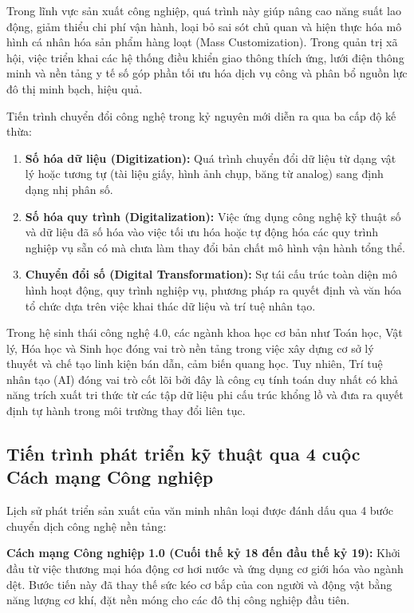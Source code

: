 Trong lĩnh vực sản xuất công nghiệp, quá trình này giúp nâng cao năng suất lao động, giảm thiểu chi phí vận hành, loại bỏ sai sót chủ quan và hiện thực hóa mô hình cá nhân hóa sản phẩm hàng loạt (Mass Customization). Trong quản trị xã hội, việc triển khai các hệ thống điều khiển giao thông thích ứng, lưới điện thông minh và nền tảng y tế số góp phần tối ưu hóa dịch vụ công và phân bổ nguồn lực đô thị minh bạch, hiệu quả.

Tiến trình chuyển đổi công nghệ trong kỷ nguyên mới diễn ra qua ba cấp độ kế thừa:
\begin{enumerate}
    \item \textbf{Số hóa dữ liệu (Digitization):} Quá trình chuyển đổi dữ liệu từ dạng vật lý hoặc tương tự (tài liệu giấy, hình ảnh chụp, băng từ analog) sang định dạng nhị phân số.
    \item \textbf{Số hóa quy trình (Digitalization):} Việc ứng dụng công nghệ kỹ thuật số và dữ liệu đã số hóa vào việc tối ưu hóa hoặc tự động hóa các quy trình nghiệp vụ sẵn có mà chưa làm thay đổi bản chất mô hình vận hành tổng thể.
    \item \textbf{Chuyển đổi số (Digital Transformation):} Sự tái cấu trúc toàn diện mô hình hoạt động, quy trình nghiệp vụ, phương pháp ra quyết định và văn hóa tổ chức dựa trên việc khai thác dữ liệu và trí tuệ nhân tạo.
\end{enumerate}

Trong hệ sinh thái công nghệ 4.0, các ngành khoa học cơ bản như Toán học, Vật lý, Hóa học và Sinh học đóng vai trò nền tảng trong việc xây dựng cơ sở lý thuyết và chế tạo linh kiện bán dẫn, cảm biến quang học. Tuy nhiên, Trí tuệ nhân tạo (AI) đóng vai trò cốt lõi bởi đây là công cụ tính toán duy nhất có khả năng trích xuất tri thức từ các tập dữ liệu phi cấu trúc khổng lồ và đưa ra quyết định tự hành trong môi trường thay đổi liên tục.

\subsection{Tiến trình phát triển kỹ thuật qua 4 cuộc Cách mạng Công nghiệp}

Lịch sử phát triển sản xuất của văn minh nhân loại được đánh dấu qua 4 bước chuyển dịch công nghệ nền tảng:

\textbf{Cách mạng Công nghiệp 1.0 (Cuối thế kỷ 18 đến đầu thế kỷ 19):} Khởi đầu từ việc thương mại hóa động cơ hơi nước và ứng dụng cơ giới hóa vào ngành dệt. Bước tiến này đã thay thế sức kéo cơ bắp của con người và động vật bằng năng lượng cơ khí, đặt nền móng cho các đô thị công nghiệp đầu tiên.


